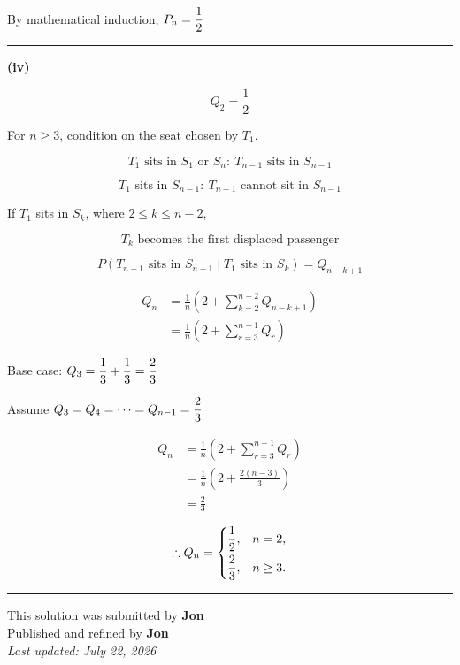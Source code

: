 \documentclass[12pt]{article}
\begin{document}
By mathematical induction, $\displaystyle P_n=\frac12$

\bigskip\hrule\bigskip

\textbf{(iv)}


$$Q_2=\frac12$$


For $n\geq3$, condition on the seat chosen by $T_1$.

$$T_1\text{ sits in }S_1 \text{ or }S_n:\ T_{n-1}\text{ sits in }S_{n-1}$$

$$T_1\text{ sits in }S_{n-1}:\ T_{n-1}\text{ cannot sit in }S_{n-1}$$

If $T_1$ sits in $S_k$, where $2\leq k\leq n-2$,

$$T_k\text{ becomes the first displaced passenger}$$

$$P(T_{n-1}\text{ sits in }S_{n-1}\mid T_1\text{ sits in }S_k)=Q_{n-k+1}$$

\begin{align*}
Q_n
&=\frac1n\left(2+\sum_{k=2}^{n-2}Q_{n-k+1}\right)\\
&=\frac1n\left(2+\sum_{r=3}^{n-1}Q_r\right)
\end{align*}

Base case: $\displaystyle Q_3=\frac13+\frac13=\frac23$

Assume $\displaystyle Q_3=Q_4=\cdots=Q_{n-1}=\frac23$

\begin{align*}
Q_n
&=\frac1n\left(2+\sum_{r=3}^{n-1}Q_r\right)\\
&=\frac1n\left(2+\frac{2(n-3)}{3}\right)\\
&=\frac23
\end{align*}

$$\therefore Q_n=
\begin{cases}
\displaystyle \frac12, & n=2,\\[6pt]
\displaystyle \frac23, & n\geq3.
\end{cases}$$

\bigskip
\hrule
\begin{center}
    This solution was submitted by \textbf{Jon}\\[4pt]
    Published and refined by \textbf{Jon}\\[8pt]
    \textit{Last updated: July 22, 2026}
\end{center}
\end{document}
